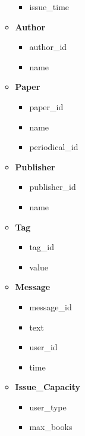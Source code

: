 \documentclass{article}
\begin{document}
\begin{itemize}
\begin{itemize}
\begin{itemize}
                    \item issue\_time
                \end{itemize}
            \item \textbf{Author}
                \begin{itemize}
                    \item {\color{blue}author\_id}
                    \item name
                \end{itemize}
            \item \textbf{Paper}
                \begin{itemize}
                    \item {\color{blue}paper\_id}
                    \item name
                    \item {\color{red}periodical\_id}
                \end{itemize}
            \item \textbf{Publisher}
                \begin{itemize}
                    \item {\color{blue}publisher\_id}
                    \item name
                \end{itemize}
            \item \textbf{Tag}
                \begin{itemize}
                    \item {\color{blue}tag\_id}
                    \item value
                \end{itemize}
            \item \textbf{Message}
                \begin{itemize}
                    \item {\color{blue}message\_id}
                    \item text
                    \item {\color{red}user\_id}
                    \item time
                \end{itemize}
            \item \textbf{{\color{green}Issue\_Capacity}}
                \begin{itemize}
                    \item {\color{blue}user\_type}
                    \item max\_books

\end{itemize}
\end{itemize}
\end{itemize}
\end{document}
